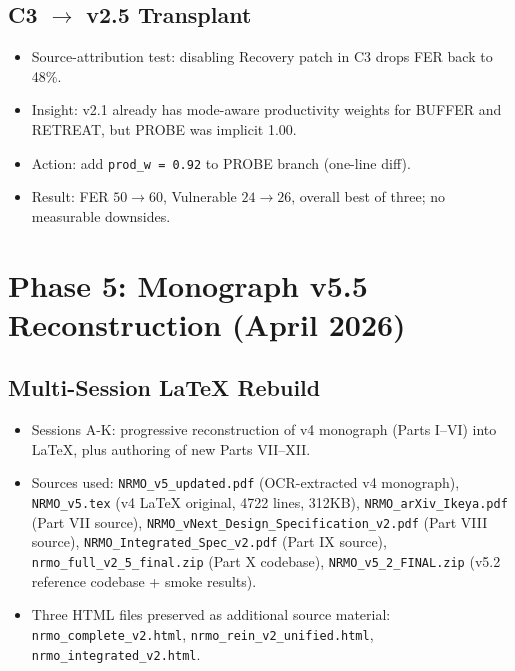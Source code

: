 \subsection*{C3 $\to$ v2.5 Transplant}

\begin{itemize}
\item Source-attribution test: disabling Recovery patch in C3 drops
FER back to 48\%.
\item Insight: v2.1 already has mode-aware productivity weights for
BUFFER and RETREAT, but PROBE was implicit 1.00.
\item Action: add \texttt{prod\_w = 0.92} to PROBE branch (one-line
diff).
\item Result: FER $50 \to 60$, Vulnerable $24 \to 26$, overall best
of three; no measurable downsides.
\end{itemize}

\section{Phase 5: Monograph v5.5 Reconstruction (April 2026)}
\label{sec:session-log-phase-5}

\subsection*{Multi-Session LaTeX Rebuild}

\begin{itemize}
\item Sessions A-K: progressive reconstruction of v4 monograph
(Parts I--VI) into LaTeX, plus authoring of new Parts VII--XII.
\item Sources used: \texttt{NRMO\_v5\_updated.pdf} (OCR-extracted
v4 monograph), \texttt{NRMO\_v5.tex} (v4 LaTeX original, 4722 lines,
312KB), \texttt{NRMO\_arXiv\_Ikeya.pdf} (Part VII source),
\texttt{NRMO\allowbreak\_vNext\allowbreak\_Design\allowbreak\_Specification\_v2.pdf} (Part VIII
source), \texttt{NRMO\_Integrated\_Spec\_v2.pdf} (Part IX source),
\texttt{nrmo\_full\_v2\_5\_final.zip} (Part X codebase),
\texttt{NRMO\_v5\_2\_FINAL.zip} (v5.2 reference codebase + smoke
results).
\item Three HTML files preserved as additional source material:
\texttt{nrmo\_complete\_v2.html}, \texttt{nrmo\_rein\allowbreak\_v2\allowbreak\_unified.html},
\texttt{nrmo\_integrated\_v2.html}.
\end{itemize}

